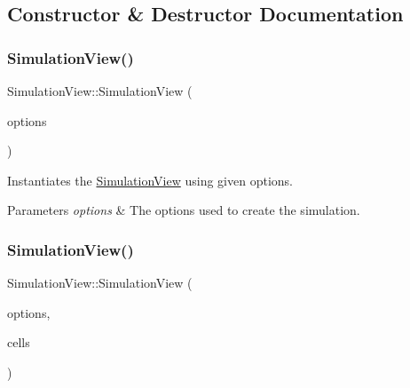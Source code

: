 \subsection{Constructor \& Destructor Documentation}
\mbox{\label{class_simulation_view_a2a540299f494c98c8b5bd61bfa0df420}} 
\subsubsection{\texorpdfstring{SimulationView()}{SimulationView()}\hspace{0.1cm}{\footnotesize\ttfamily [1/2]}}
{\footnotesize\ttfamily Simulation\+View\+::\+Simulation\+View (\begin{DoxyParamCaption}\item[{\mbox{\hyperlink{class_ref}{Ref}}$<$ \mbox{\hyperlink{class_simulation_options}{Simulation\+Options}} $>$}]{options }\end{DoxyParamCaption})}



Instantiates the \mbox{\hyperlink{class_simulation_view}{Simulation\+View}} using given options. 


\begin{DoxyParams}{Parameters}
{\em options} & The options used to create the simulation.\\
\hline
\end{DoxyParams}
\mbox{\label{class_simulation_view_aecea878e3f70e00c9d618ec939ebaf7e}} 
\subsubsection{\texorpdfstring{SimulationView()}{SimulationView()}\hspace{0.1cm}{\footnotesize\ttfamily [2/2]}}
{\footnotesize\ttfamily Simulation\+View\+::\+Simulation\+View (\begin{DoxyParamCaption}\item[{\mbox{\hyperlink{class_ref}{Ref}}$<$ \mbox{\hyperlink{class_simulation_options}{Simulation\+Options}} $>$}]{options,  }\item[{\mbox{\hyperlink{class_ref}{Ref}}$<$ uint8\+\_\+t\mbox{[}$\,$\mbox{]}$>$}]{cells }\end{DoxyParamCaption})}



